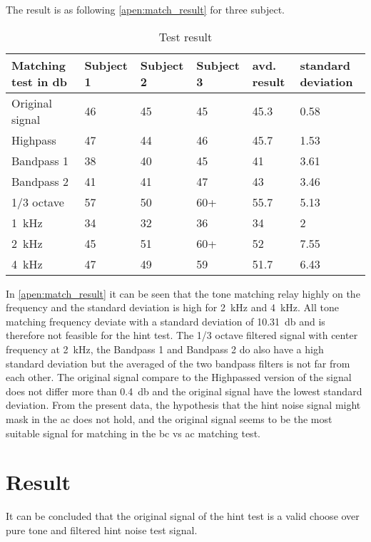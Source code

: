 The result is as following \autoref{apen:match_result} for three subject. 

\begin{table}[H]
\caption{Test result}
\begin{tabular}{l|lll|ll}
Matching test in \si{\decibel}       & Subject 1 & Subject 2 & Subject 3 & avd. result & standard deviation \\ \hline
Original signal         & 46        & 45        & 45        & 45.3        & 0.58               \\
Highpass         & 47        & 44        & 46        & 45.7        & 1.53               \\
Bandpass 1         & 38        & 40        & 45        & 41          & 3.61               \\
Bandpass 2        & 41        & 41        & 47        & 43          & 3.46               \\
1/3 octave & 57        & 50        & 60+       & 55.7        & 5.13               \\
\SI{1}{\kilo\hertz}                   & 34        & 32        & 36        & 34          & 2                  \\
\SI{2}{\kilo\hertz}                  & 45        & 51        & 60+       & 52          & 7.55               \\
\SI{4}{\kilo\hertz}                  & 47        & 49        & 59        & 51.7        &  6.43                 
\end{tabular}
\label{apen:match_result}
\end{table}

In \autoref{apen:match_result} it can be seen that the tone matching relay highly on the frequency and the standard deviation is high for \SI{2}{\kilo\hertz}  and \SI{4}{\kilo\hertz}. All tone matching frequency deviate with a standard deviation of \SI{10.31}{\decibel} and is therefore not feasible for the \gls{hint} test. The 1/3 octave filtered signal with center frequency at \SI{2}{\kilo\hertz}, the Bandpass 1 and Bandpass 2 do also have a high standard deviation but the averaged of the two bandpass filters is not far from each other. The original signal compare to the Highpassed version of the signal does not differ more than \SI{0.4}{\decibel} and the original signal have the lowest standard deviation. From the present data, the hypothesis that the \gls{hint} noise signal might mask in the \gls{ac} does not hold, and the original signal seems to be the most suitable signal for matching in the \gls{bc} vs \gls{ac} matching test.

\section*{Result}
It can be concluded that the original signal of the \gls{hint} test is a valid choose over pure tone and filtered \gls{hint} noise test signal.

